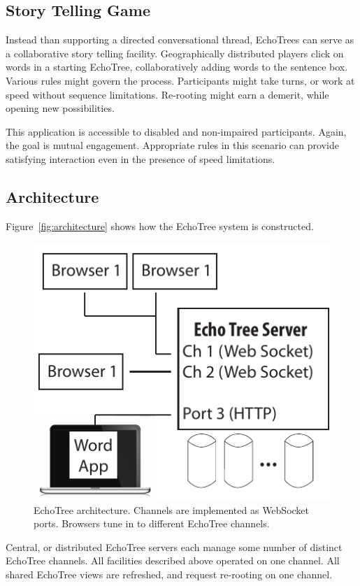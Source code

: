 \documentclass{sigchi}
\begin{document}
\subsection{Story Telling Game}

Instead than supporting a directed conversational thread,
EchoTrees can serve as a collaborative story telling
facility. Geographically distributed players click on words in a
starting EchoTree, collaboratively adding words to the sentence
box. Various rules might govern the process. Participants might take
turns, or work at speed without sequence limitations. Re-rooting might
earn a demerit, while opening new possibilities. 

This application is accessible to disabled and non-impaired
participants. Again, the goal is mutual engagement. Appropriate rules
in this scenario can provide satisfying interaction even in the
presence of speed limitations.

\subsection{Architecture}

Figure~\ref{fig:architecture} shows how the EchoTree system is
constructed. 
\begin{figure}
   \centering
   \includegraphics[width=\columnwidth]{Figs/echoTreeArch.pdf}
   \caption{EchoTree architecture. Channels are implemented as
     WebSocket ports. Browsers tune in to different EchoTree channels.}
   \label{fig:arch}
\end{figure}
Central, or distributed EchoTree servers each manage some
number of distinct EchoTree channels. All facilities described above
operated on one channel. All shared EchoTree views are refreshed, and
request re-rooting on one channel. 
\end{document}
